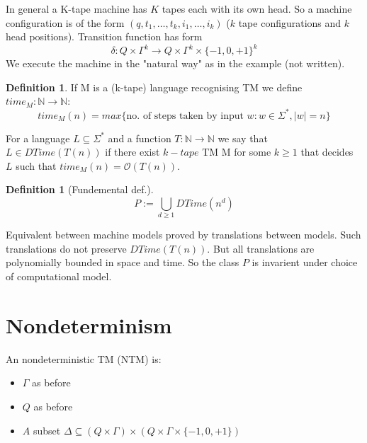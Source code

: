 \documentclass[a4paper,12pt]{article}
\theoremstyle{definition}
\newtheorem{definition}[counter]{Definition}
\theoremstyle{remark}
\newcommand{\N}{\mathbb{N}}
\begin{document}
In general a K-tape machine has $K$ tapes each with its own head. So a machine configuration is of the form 
$(q, t_1, \dots, t_k, i_1, \dots, i_k)$ ($k$ tape configurations and $k$ head positions).
Transition function has form
\begin{equation*}
    \delta: Q \times \Gamma^k \to Q \times \Gamma^k \times \{-1, 0, +1\}^k
\end{equation*}
We execute the machine in the "natural way" as in the example (not written).

\begin{definition}
    If M is a (k-tape) language recognising TM we define $time_M: \N \to \N$:
    \begin{equation*}
        time_M(n) = max \{\text{no. of steps taken by input }w: w \in \Sigma^*,  |w| = n\}
    \end{equation*}

    For a language $L \subseteq \Sigma^*$ and a function $T: \N \to \N$ we say that $L \in DTime(T(n))$ if there exist $k-tape$ TM M for
    some $k \geq 1$ that decides $L$ such that $time_M(n) = \mathscr{O}(T(n))$.
\end{definition}

\begin{definition}[Fundemental def.]
    \begin{equation*}
        P := \bigcup\limits_{d \geq 1} DTime(n^d)
    \end{equation*}
\end{definition}

Equivalent between machine models proved by translations between models. Such translations do not preserve $DTime(T(n))$. But 
all translations are polynomially bounded in space and time. So the class $P$ is invarient under choice of computational model.






\newpage
\section{Nondeterminism}
An nondeterministic TM (NTM) is:
\begin{itemize}
    \item $\Gamma$ as before
    \item $Q$ as before
    \item $A$ subset $\Delta \subseteq (Q \times \Gamma) \times (Q \times \Gamma \times \{-1, 0, +1\})$
\end{itemize}
\end{document}
